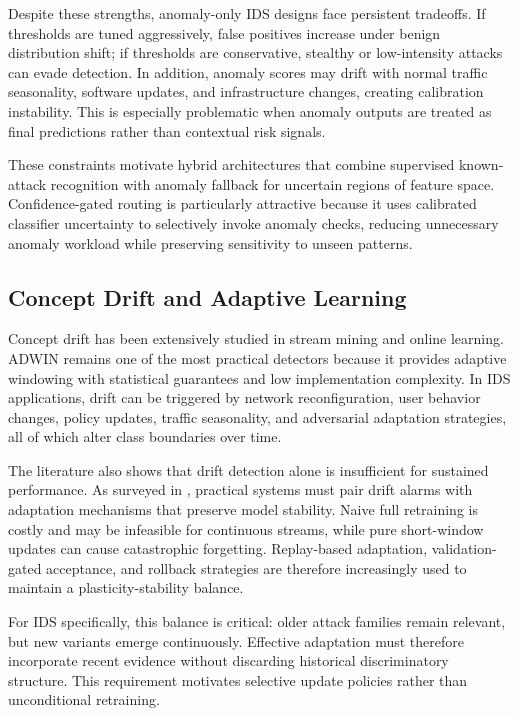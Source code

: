 \documentclass[conference]{IEEEtran}
\begin{document}
Despite these strengths, anomaly-only IDS designs face persistent tradeoffs. If thresholds are tuned aggressively, false positives increase under benign distribution shift; if thresholds are conservative, stealthy or low-intensity attacks can evade detection. In addition, anomaly scores may drift with normal traffic seasonality, software updates, and infrastructure changes, creating calibration instability. This is especially problematic when anomaly outputs are treated as final predictions rather than contextual risk signals.

These constraints motivate hybrid architectures that combine supervised known-attack recognition with anomaly fallback for uncertain regions of feature space. Confidence-gated routing is particularly attractive because it uses calibrated classifier uncertainty to selectively invoke anomaly checks, reducing unnecessary anomaly workload while preserving sensitivity to unseen patterns.

\subsection{Concept Drift and Adaptive Learning}
Concept drift has been extensively studied in stream mining and online learning. ADWIN \cite{bifet2007learning} remains one of the most practical detectors because it provides adaptive windowing with statistical guarantees and low implementation complexity. In IDS applications, drift can be triggered by network reconfiguration, user behavior changes, policy updates, traffic seasonality, and adversarial adaptation strategies, all of which alter class boundaries over time.

The literature also shows that drift detection alone is insufficient for sustained performance. As surveyed in \cite{gama2014survey}, practical systems must pair drift alarms with adaptation mechanisms that preserve model stability. Naive full retraining is costly and may be infeasible for continuous streams, while pure short-window updates can cause catastrophic forgetting. Replay-based adaptation, validation-gated acceptance, and rollback strategies are therefore increasingly used to maintain a plasticity-stability balance.

For IDS specifically, this balance is critical: older attack families remain relevant, but new variants emerge continuously. Effective adaptation must therefore incorporate recent evidence without discarding historical discriminatory structure. This requirement motivates selective update policies rather than unconditional retraining.
\end{document}
